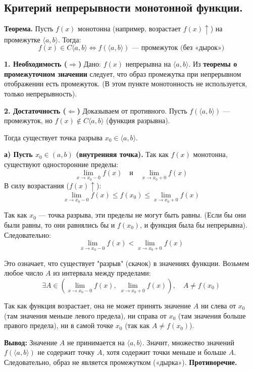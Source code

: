 \subsection{Критерий непрерывности монотонной функции.}

\textbf{Теорема.} Пусть $f(x)$ монотонна (например, возрастает $f(x) \uparrow$) на промежутке $\langle a, b \rangle$. Тогда:
\[ f(x) \in C\langle a, b \rangle \iff f(\langle a, b \rangle) \text{ — промежуток (без «дырок»)} \]

\begin{tcolorbox}[title=Доказательство]
    \textbf{1. Необходимость ($\Rightarrow$)}
    Дано: $f(x)$ непрерывна на $\langle a, b \rangle$.
    Из \textbf{теоремы о промежуточном значении} следует, что образ промежутка при непрерывном отображении есть промежуток. (В этом пункте монотонность не используется, только непрерывность).
    
    \textbf{2. Достаточность ($\Leftarrow$)}
    Доказываем от противного.
    Пусть $f(\langle a, b \rangle)$ — промежуток, но $f(x) \notin C\langle a, b \rangle$ (функция разрывна).
    
    Тогда существует точка разрыва $x_0 \in \langle a, b \rangle$.
    
    \textbf{а) Пусть $x_0 \in (a, b)$ (внутренняя точка).}
    Так как $f(x)$ монотонна, существуют односторонние пределы:
    \[ \lim_{x \to x_0 - 0} f(x) \quad \text{и} \quad \lim_{x \to x_0 + 0} f(x) \]
    В силу возрастания ($f(x) \uparrow$):
    \[ \lim_{x \to x_0 - 0} f(x) \le f(x_0) \le \lim_{x \to x_0 + 0} f(x) \]
    
    Так как $x_0$ — точка разрыва, эти пределы не могут быть равны. (Если бы они были равны, то они равнялись бы и $f(x_0)$, и функция была бы непрерывна).
    Следовательно:
    \[ \lim_{x \to x_0 - 0} f(x) < \lim_{x \to x_0 + 0} f(x) \]
    
    Это означает, что существует "разрыв" (скачок) в значениях функции.
    Возьмем любое число $A$ из интервала между пределами:
    \[ \exists A \in \left( \lim_{x \to x_0 - 0} f(x), \; \lim_{x \to x_0 + 0} f(x) \right), \quad A \neq f(x_0) \]
    
    Так как функция возрастает, она не может принять значение $A$ ни слева от $x_0$ (там значения меньше левого предела), ни справа от $x_0$ (там значения больше правого предела), ни в самой точке $x_0$ (так как $A \neq f(x_0)$).
    
    \textbf{Вывод:} Значение $A$ не принимается на $\langle a, b \rangle$.
    Значит, множество значений $f(\langle a, b \rangle)$ не содержит точку $A$, хотя содержит точки меньше и больше $A$. Следовательно, образ не является промежутком («дырка»). \textbf{Противоречие.}
    

\end{tcolorbox}
